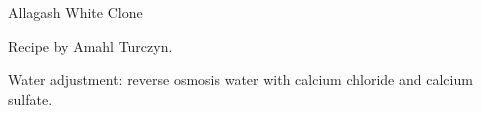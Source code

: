 \stylesection{\stylewitbier}

\begin{recipe}{Allagash White Clone} %

\begin{aboutblock}
Recipe by Amahl Turczyn. 
\end{aboutblock}


\begin{methodandtiming}

\begin{mashsteps}
\end{mashsteps}

\begin{fermentationsteps}
\end{fermentationsteps}

\begin{directions}
Water adjustment: reverse osmosis water with  calcium chloride and
 calcium sulfate.
\end{directions}

\end{methodandtiming}

\recipebreak

\begin{ingredientsblock}

\begin{malts}
\end{malts}

\begin{hops}

\end{hops}


\end{ingredientsblock}

\end{recipe}

